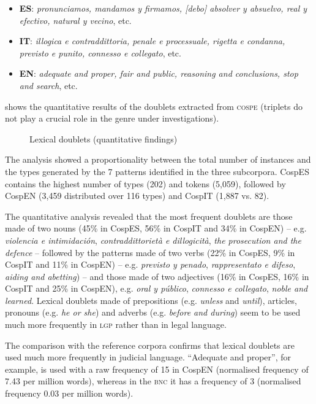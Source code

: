 \documentclass[output=paper]{LSP/langsci}
\begin{document}
\begin{itemize}
\item \textbf{ES}: \textit{pronunciamos, mandamos y firmamos, [debo] absolver y absuelvo, real y efectivo, natural y vecino}, etc.
\item \textbf{IT}: \textit{illogica e contraddittoria, penale e processuale, rigetta e condanna, previsto e punito, connesso e collegato}, etc.
\item \textbf{EN}: \textit{adequate and proper, fair and public, reasoning and conclusions, stop and search}, etc.
\end{itemize}

 shows the quantitative results of the doublets extracted from \textsc{cospe} (triplets do not play a crucial role in the genre under investigations).

\begin{figure}

\caption{Lexical doublets (quantitative findings)} \label{fig:6:2}
\end{figure}

The analysis showed a proportionality between the total number of instances and the types generated by the 7 patterns identified in the three subcorpora. CospES contains the highest number of types (202) and tokens (5,059), followed by CospEN (3,459 distributed over 116 types) and CospIT (1,887 vs. 82).

The quantitative analysis revealed that the most frequent doublets are those made of two nouns (45\% in CospES, 56\% in CospIT and 34\% in CospEN) – e.g. \textit{violencia e intimidación}, \textit{contraddittorietà e dillogicità}, \textit{the prosecution and the defence} – followed by the patterns made of two verbs (22\% in CospES, 9\% in CospIT and 11\% in CospEN) – e.g. \textit{previsto y penado}, \textit{rappresentato e difeso}, \textit{aiding and abetting}) – and those made of two adjectives (16\% in CospES, 16\% in CospIT and 25\% in CospEN), e.g. \textit{oral y público}, \textit{connesso e collegato}, \textit{noble and learned}. Lexical doublets made of prepositions (e.g. \textit{unless} and \textit{until}), articles, pronouns (e.g. \textit{he or she}) and adverbs (e.g. \textit{before and during}) seem to be used much more frequently in \textsc{lgp} rather than in legal language.

The comparison with the reference corpora confirms that lexical doublets are used much more frequently in judicial language. “Adequate and proper”, for example, is used with a raw frequency of 15 in CospEN (normalised frequency of 7.43 per million words), whereas in the \textsc{bnc} it has a frequency of 3 (normalised frequency 0.03 per million words).
\end{document}
